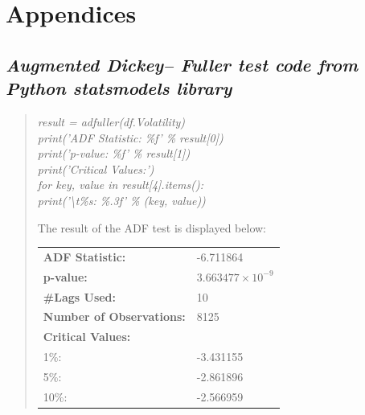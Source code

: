 \documentclass[12pt,a4paper]{report}
\numberwithin{equation}{section}
\begin{document}

\hypertarget{appendix}{%
\chapter*{Appendices}\label{appendix}
\setcounter{section}{0}
\setcounter{subsection}{0}
\renewcommand{\thesection}{A\arabic{section}}
\renewcommand{\thesubsection}{\thesection.\arabic{subsection}}
}

\hypertarget{augmented--dickey----fuller--test--code--from--python--statsmodels--library}{%
\section{\texorpdfstring{\emph{\textbf{Augmented Dickey-- Fuller test
code from Python statsmodels
library}}}{Augmented Dickey-- Fuller test code from Python statsmodels library}}\label{augmented--dickey----fuller--test--code--from--python--statsmodels--library}}

\begin{quote}
\emph{result = adfuller(df.Volatility)} \\
\emph{print('ADF Statistic: \%f' \% result[0])} \\
\emph{print('p-value: \%f' \% result[1])} \\
\emph{print('Critical Values:')} \\
\emph{for key, value in result[4].items():} \\
\indent \emph{print('\textbackslash t\%s: \%.3f' \% (key, value))}

\vspace{1em}

The result of the ADF test is displayed below:

\begin{tabular}{ll}
\textbf{ADF Statistic:} & -6.711864 \\
\textbf{p-value:} & $3.663477 \times 10^{-9}$ \\
\textbf{\#Lags Used:} & 10 \\
\textbf{Number of Observations:} & 8125 \\
\textbf{Critical Values:} & \\
\hspace{1em} 1\%: & -3.431155 \\
\hspace{1em} 5\%: & -2.861896 \\
\hspace{1em} 10\%: & -2.566959 \\
\end{tabular}
\end{quote}
\end{document}
